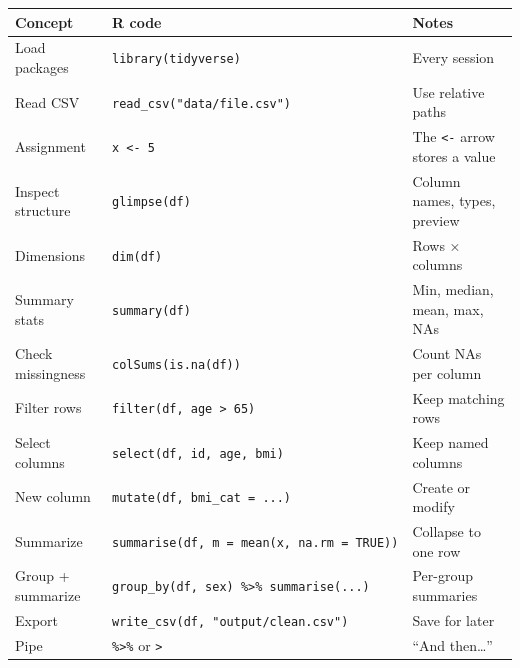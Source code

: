 \documentclass[
  letterpaper,
  DIV=11,
  numbers=noendperiod,
  oneside]{scrreprt}
\begin{document}
\begin{longtable}[]{@{}
  >{\raggedright\arraybackslash}p{}
  >{\raggedright\arraybackslash}p{}
  >{\raggedright\arraybackslash}p{}@{}}
\toprule\noalign{}
\begin{minipage}[b]{\linewidth}\raggedright
Concept
\end{minipage} & \begin{minipage}[b]{\linewidth}\raggedright
R code
\end{minipage} & \begin{minipage}[b]{\linewidth}\raggedright
Notes
\end{minipage} \\
\midrule\noalign{}
\endhead
\bottomrule\noalign{}
\endlastfoot
Load packages & \texttt{library(tidyverse)} & Every session \\
Read CSV & \texttt{read\_csv("data/file.csv")} & Use relative paths \\
Assignment & \texttt{x\ \textless{}-\ 5} & The \texttt{\textless{}-}
arrow stores a value \\
Inspect structure & \texttt{glimpse(df)} & Column names, types,
preview \\
Dimensions & \texttt{dim(df)} & Rows × columns \\
Summary stats & \texttt{summary(df)} & Min, median, mean, max, NAs \\
Check missingness & \texttt{colSums(is.na(df))} & Count NAs per
column \\
Filter rows & \texttt{filter(df,\ age\ \textgreater{}\ 65)} & Keep
matching rows \\
Select columns & \texttt{select(df,\ id,\ age,\ bmi)} & Keep named
columns \\
New column & \texttt{mutate(df,\ bmi\_cat\ =\ ...)} & Create or
modify \\
Summarize & \texttt{summarise(df,\ m\ =\ mean(x,\ na.rm\ =\ TRUE))} &
Collapse to one row \\
Group + summarize &
\texttt{group\_by(df,\ sex)\ \%\textgreater{}\%\ summarise(...)} &
Per-group summaries \\
Export & \texttt{write\_csv(df,\ "output/clean.csv")} & Save for
later \\
Pipe & \texttt{\%\textgreater{}\%} or \texttt{\textbar{}\textgreater{}}
& ``And then\ldots{}'' \\
\end{longtable}
\end{document}
